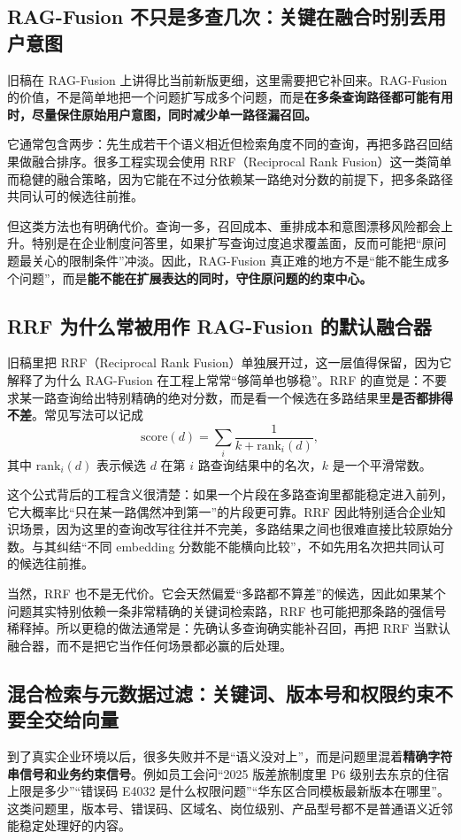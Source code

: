 \subsection{RAG-Fusion 不只是多查几次：关键在融合时别丢用户意图}
旧稿在 RAG-Fusion 上讲得比当前新版更细，这里需要把它补回来。RAG-Fusion 的价值，不是简单地把一个问题扩写成多个问题，而是\textbf{在多条查询路径都可能有用时，尽量保住原始用户意图，同时减少单一路径漏召回。}

它通常包含两步：先生成若干个语义相近但检索角度不同的查询，再把多路召回结果做融合排序。很多工程实现会使用 RRF（Reciprocal Rank Fusion）这一类简单而稳健的融合策略，因为它能在不过分依赖某一路绝对分数的前提下，把多条路径共同认可的候选往前推。

但这类方法也有明确代价。查询一多，召回成本、重排成本和意图漂移风险都会上升。特别是在企业制度问答里，如果扩写查询过度追求覆盖面，反而可能把“原问题最关心的限制条件”冲淡。因此，RAG-Fusion 真正难的地方不是“能不能生成多个问题”，而是\textbf{能不能在扩展表达的同时，守住原问题的约束中心。}

\subsection{RRF 为什么常被用作 RAG-Fusion 的默认融合器}
旧稿里把 RRF（Reciprocal Rank Fusion）单独展开过，这一层值得保留，因为它解释了为什么 RAG-Fusion 在工程上常常“够简单也够稳”。RRF 的直觉是：不要求某一路查询给出特别精确的绝对分数，而是看一个候选在多路结果里\textbf{是否都排得不差}。常见写法可以记成
\[
\mathrm{score}(d)=\sum_i \frac{1}{k+\mathrm{rank}_i(d)},
\]
其中 \(\mathrm{rank}_i(d)\) 表示候选 \(d\) 在第 \(i\) 路查询结果中的名次，\(k\) 是一个平滑常数。

这个公式背后的工程含义很清楚：如果一个片段在多路查询里都能稳定进入前列，它大概率比“只在某一路偶然冲到第一”的片段更可靠。RRF 因此特别适合企业知识场景，因为这里的查询改写往往并不完美，多路结果之间也很难直接比较原始分数。与其纠结“不同 embedding 分数能不能横向比较”，不如先用名次把共同认可的候选往前推。

当然，RRF 也不是无代价。它会天然偏爱“多路都不算差”的候选，因此如果某个问题其实特别依赖一条非常精确的关键词检索路，RRF 也可能把那条路的强信号稀释掉。所以更稳的做法通常是：先确认多查询确实能补召回，再把 RRF 当默认融合器，而不是把它当作任何场景都必赢的后处理。

\subsection{混合检索与元数据过滤：关键词、版本号和权限约束不要全交给向量}
到了真实企业环境以后，很多失败并不是“语义没对上”，而是问题里混着\textbf{精确字符串信号和业务约束信号}。例如员工会问“2025 版差旅制度里 P6 级别去东京的住宿上限是多少”“错误码 E4032 是什么权限问题”“华东区合同模板最新版本在哪里”。这类问题里，版本号、错误码、区域名、岗位级别、产品型号都不是普通语义近邻能稳定处理好的内容。

